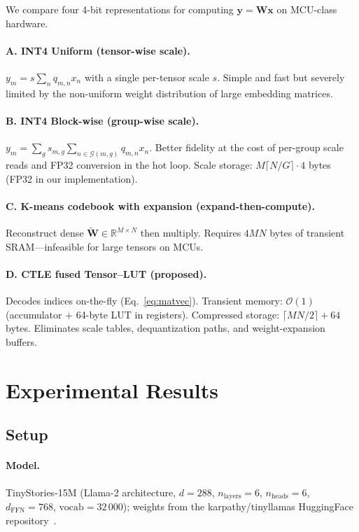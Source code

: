 \documentclass[lettersize,journal]{IEEEtran}
\begin{document}
We compare four 4-bit representations for computing $\mathbf{y}=\mathbf{W}\mathbf{x}$
on MCU-class hardware.

\paragraph{A. INT4 Uniform (tensor-wise scale).}
$y_m = s\sum_n q_{m,n}x_n$ with a single per-tensor scale $s$.
Simple and fast but severely limited by the non-uniform weight distribution of
large embedding matrices.

\paragraph{B. INT4 Block-wise (group-wise scale).}
$y_m = \sum_g s_{m,g}\sum_{n\in\mathcal{G}(m,g)}q_{m,n}x_n$.
Better fidelity at the cost of per-group scale reads and FP32 conversion in the
hot loop.
Scale storage: $M\lceil N/G\rceil\!\cdot\!4$ bytes (FP32 in our implementation).

\paragraph{C. K-means codebook with expansion (expand-then-compute).}
Reconstruct dense $\tilde{\mathbf{W}}\in\mathbb{R}^{M\times N}$ then multiply.
Requires $4MN$ bytes of transient SRAM---infeasible for large tensors on MCUs.

\paragraph{D. CTLE fused Tensor--LUT (proposed).}
Decodes indices on-the-fly (Eq.~\ref{eq:matvec}).
Transient memory: $\mathcal{O}(1)$ (accumulator + 64-byte LUT in registers).
Compressed storage: $\lceil MN/2\rceil + 64$ bytes.
Eliminates scale tables, dequantization paths, and weight-expansion buffers.


\section{Experimental Results}
\label{sec:results}

\subsection{Setup}
\label{sec:setup}

\paragraph{Model.}
TinyStories-15M (Llama-2 architecture,
$d\!=\!288$, $n_\mathrm{layers}\!=\!6$, $n_\mathrm{heads}\!=\!6$,
$d_\mathrm{FFN}\!=\!768$, $\mathrm{vocab}\!=\!32\,000$);
weights from the karpathy/tinyllamas HuggingFace
repository~\cite{karpathy2023llama2c}.
\end{document}
